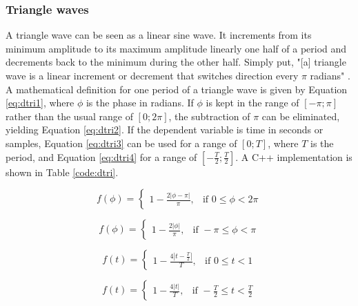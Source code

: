 \begin{table}
\end{table}

\subsubsection{Triangle waves}

A triangle wave can be seen as a linear sine wave. It increments from its minimum amplitude to its maximum amplitude linearly one half of a period and decrements back to the minimum during the other half. Simply put, "[a] triangle wave is a linear increment or decrement that switches direction every $\pi$ radians" . A mathematical definition for one period of a triangle wave is given by Equation  \ref{eq:dtri1}, where $\phi$ is the phase in radians. If $\phi$ is kept in the range of $[-\pi;\pi]$ rather than the usual range of $[0;2 \pi]$, the subtraction of $\pi$ can be eliminated, yielding Equation  \ref{eq:dtri2}. If the dependent variable is time in seconds or samples, Equation  \ref{eq:dtri3} can be used for a range of $[0;T]$, where $T$ is the period, and Equation  \ref{eq:dtri4} for a range of $[-\frac{T}{2};\frac{T}{2}]$. A C++ implementation is shown in Table \ref{code:dtri}.

\begin{multicols}{2}

  \begin{equation}
    f(\phi) =
    \begin{cases}
      1 - \frac{2 |\phi - \pi|}{\pi},& \text{if } 0 \leq \phi < 2 \pi
    \end{cases}
    \label{eq:dtri1}
  \end{equation}

  \begin{equation}
    f(\phi) =
    \begin{cases}
      1 - \frac{2 |\phi|}{\pi},& \text{if } -\pi \leq \phi < \pi
    \end{cases}
    \label{eq:dtri2}
  \end{equation}

\end{multicols}

\begin{multicols}{2}

  \begin{equation}
    f(t) =
    \begin{cases}
      1 - \frac{4 |t - \frac{T}{2}|}{T},& \text{if } 0 \leq t < 1
    \end{cases}
    \label{eq:dtri3}
  \end{equation}

  \begin{equation}
    f(t) =
    \begin{cases}
      1 - \frac{4 |t|}{T},& \text{if } -\frac{T}{2} \leq t < \frac{T}{2}
    \end{cases}
    \label{eq:dtri4}
  \end{equation}

\end{multicols}

